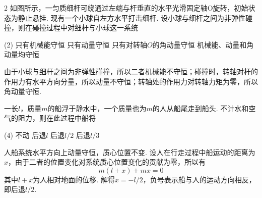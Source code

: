 \begin{problem}
    \begin{paracol}{2}
    如图所示，一匀质细杆可绕通过左端与杆垂直的水平光滑固定轴O旋转，初始状态为静止悬挂. 现有一个小球自左方水平打击细杆. 设小球与细杆之间为非弹性碰撞，则在碰撞过程中对细杆与小球这一系统
    \switchcolumn\vspace*{\fill}\centering
    \vspace*{\fill}
    \end{paracol}
    \begin{tasks}(2)
        \task 只有机械能守恒
        \task 只有动量守恒
        \task[\true] 只有对转轴$O$的角动量守恒
        \task 机械能、动量和角动量均守恒
    \end{tasks}
\end{problem}
\begin{solution}
    由于小球与细杆之间为非弹性碰撞，所以二者机械能不守恒；碰撞时，转轴对杆的作用力有水平方向分量，所以动量不守恒；转轴处的作用力对转轴力矩为零，所以角动量守恒.
\end{solution}

\begin{problem}
    一长$l$，质量$m$的船浮于静水中，一个质量也为$m$的人从船尾走到船头. 不计水和空气的阻力，则在此过程中船将
    \begin{tasks}(4)
        \task 不动
        \task 后退$l$
        \task[\true] 后退$l/2$
        \task 后退$l/3$
    \end{tasks}
\end{problem}
\begin{solution}
    人船系统水平方向上动量守恒，质心位置不变. 设人在行走过程中船运动的距离为$x$，由于二者的位置变化对系统质心位置变化的贡献为零，所以有
    \[m(l+x)+mx=0\]
    其中$l+x$为人相对地面的位移. 解得$x=-l/2$，负号表示船与人的运动方向相反，即后退$l/2$.
\end{solution}


